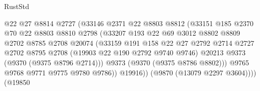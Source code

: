 \begin{lexlean}{RustStd}
\begin{coremodule}
{\begin{coremodule}
{{{{{{{{{{{{{{{{{{{{{{{{{{{{{{{{{{{{{{{                                    @22
                                    @27
                                    @8814
                                    @2727
                                    (@33146
                                      @2371
                                      @22
                                      @8803
                                      @8812
                                      (@33151
                                        @185
                                        @2370
                                        @70
                                        @22
                                        @8803
                                        @8810
                                        @2798
                                        (@33207
                                          @193
                                          @22
                                          @69
                                          @3012
                                          @8802
                                          @8809
                                          @2702
                                          @8785
                                          @2708
                                          @20074
                                          (@33159
                                            @191
                                            @158
                                            @22
                                            @27
                                            @2792
                                            @2714
                                            @2727
                                            @2702
                                            @8795
                                            @2708
                                            (@19903 @22 @190 @2792 @9740 @9746)
                                            @20213
                                            @9373
                                            (@9370 (@9375 @8796 @2714)))
                                          @9373
                                          (@9370 (@9375 @8786 @8802)))
                                        @9765
                                        @9768
                                        @9771
                                        @9775
                                        @9780
                                        @9786))
                                    @19916))
                                (@9870 (@13079 @2297 @3604))))
                            (@19850
}}}}}}}}}}}}}}}}}}}}}}}}}}}}}}}}}}}}}}}
\end{coremodule}}
\end{coremodule}
\end{lexlean}
